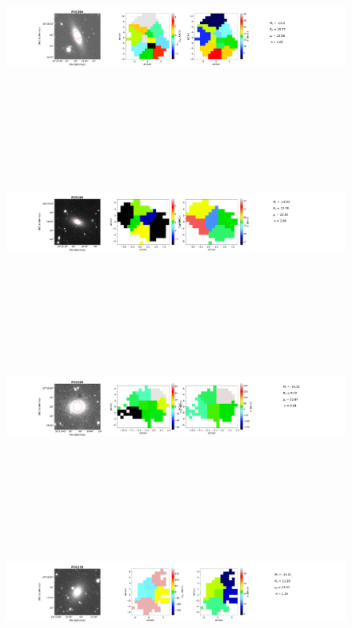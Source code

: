 \documentclass{aa}
\begin{document}
\begin{figure}[!htb]
   \ContinuedFloat
   \centering
   \includegraphics[width=21cm,height=6cm,keepaspectratio]{../2_pipeline/1_V&S_Maps/264Velocity_map.pdf}
   \includegraphics[width=21cm,height=6cm,keepaspectratio]{../2_pipeline/1_V&S_Maps/195Velocity_map.pdf}
   \includegraphics[width=21cm,height=6cm,keepaspectratio]{../2_pipeline/1_V&S_Maps/250Velocity_map.pdf}
   \includegraphics[width=21cm,height=6cm,keepaspectratio]{../2_pipeline/1_V&S_Maps/178Velocity_map.pdf}

\end{figure}
\end{document}
